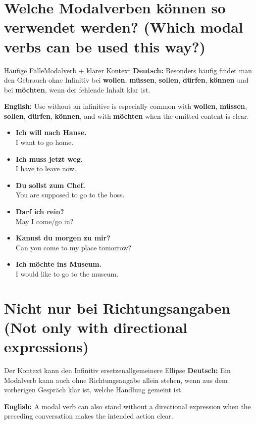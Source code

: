 \documentclass[a4paper,11pt]{article}
\newcommand{\GermanText}[1]{\textbf{Deutsch: }#1\par}
\newcommand{\EnglishText}[1]{{\small\color{SoftGray}\textbf{English: }#1\par}}
\newcommand{\ExampleItem}[2]{\item \textbf{#1}\\{\small\color{SoftGray}#2}}
\begin{document}
    \section{Welche Modalverben können so verwendet werden? \textnormal{(Which modal verbs can be used this way?)}}

        \begin{grammarentry}{Häufige Fälle}{Modalverb + klarer Kontext}
            \GermanText{Besonders häufig findet man den Gebrauch ohne Infinitiv bei \textbf{wollen}, \textbf{müssen}, \textbf{sollen}, \textbf{dürfen}, \textbf{können} und bei \textbf{möchten}, wenn der fehlende Inhalt klar ist.}
            \EnglishText{Use without an infinitive is especially common with \textbf{wollen}, \textbf{müssen}, \textbf{sollen}, \textbf{dürfen}, \textbf{können}, and with \textbf{möchten} when the omitted content is clear.}
        \end{grammarentry}

        \begin{exbox}
            \begin{itemize}
                \ExampleItem{Ich will nach Hause.}{I want to go home.}
                \ExampleItem{Ich muss jetzt weg.}{I have to leave now.}
                \ExampleItem{Du sollst zum Chef.}{You are supposed to go to the boss.}
                \ExampleItem{Darf ich rein?}{May I come/go in?}
                \ExampleItem{Kannst du morgen zu mir?}{Can you come to my place tomorrow?}
                \ExampleItem{Ich möchte ins Museum.}{I would like to go to the museum.}
            \end{itemize}
        \end{exbox}

    \section{Nicht nur bei Richtungsangaben \textnormal{(Not only with directional expressions)}}

        \begin{grammarentry}{Der Kontext kann den Infinitiv ersetzen}{allgemeinere Ellipse}
            \GermanText{Ein Modalverb kann auch ohne Richtungsangabe allein stehen, wenn aus dem vorherigen Gespräch klar ist, welche Handlung gemeint ist.}
            \EnglishText{A modal verb can also stand without a directional expression when the preceding conversation makes the intended action clear.}
        \end{grammarentry}
\end{document}
